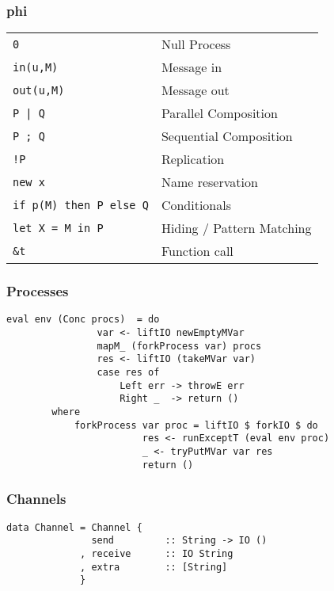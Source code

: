 \documentclass[t]{beamer}
\begin{document}
\begin{frame}[fragile]
\frametitle{phi}
\begin{table}[hc!]
    \begin{tabular}{l l}
        \verb!0!                      &  Null Process\\
        \verb!in(u,M)!                &  Message in\\
        \verb!out(u,M)!               &  Message out\\
        \verb!P | Q!                  &  Parallel Composition\\
        \verb!P ; Q!                  &  Sequential Composition\\
        \verb?!P?                     &  Replication\\
        \verb!new x!                  &  Name reservation\\
        \verb!if p(M) then P else Q!  &  Conditionals\\
        \verb!let X = M in P!         &  Hiding / Pattern Matching \\
        \verb!&t!                     &  Function call\\
    \end{tabular}
\end{table} 
\end{frame}

\begin{frame}[fragile]
\frametitle{Processes}
\begin{verbatim}
eval env (Conc procs)  = do
                var <- liftIO newEmptyMVar 
                mapM_ (forkProcess var) procs
                res <- liftIO (takeMVar var)
                case res of
                    Left err -> throwE err
                    Right _  -> return ()
        where
            forkProcess var proc = liftIO $ forkIO $ do
                        res <- runExceptT (eval env proc)
                        _ <- tryPutMVar var res
                        return ()
\end{verbatim}
\end{frame}

\begin{frame}[fragile]
\frametitle{Channels}
\begin{verbatim}
data Channel = Channel {
               send         :: String -> IO ()
             , receive      :: IO String
             , extra        :: [String]
             }
\end{verbatim}

\end{frame}
\end{document}
